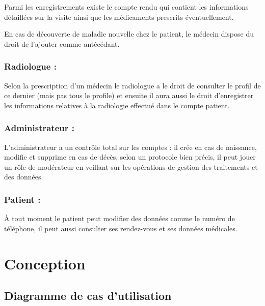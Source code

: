 Parmi les enregistrements existe le compte rendu qui contient les informations détaillées sur la visite ainsi que les médicaments prescrits éventuellement. 

En cas de découverte de maladie nouvelle chez le patient, le médecin dispose du droit de l’ajouter comme antécédant. 

\subsubsection{Radiologue :} 

Selon la prescription d’un médecin le radiologue a le droit de consulter le profil de ce dernier (mais pas tous le profile) et ensuite il aura aussi le droit d’enregistrer les informations relatives à la radiologie effectué dans le compte patient. 

\subsubsection{Administrateur :}  

L’administrateur a un contrôle total sur les comptes : il crée en cas de naissance, modifie et supprime en cas de décès, selon un protocole bien précis, il peut jouer un rôle de modérateur en veillant sur les opérations de gestion des traitements et des données. 

\subsubsection{Patient :} 

À tout moment le patient peut modifier des données comme le numéro de téléphone, il peut aussi consulter ses rendez-vous et ses données médicales. 



\section{Conception}

\subsection{Diagramme de cas d'utilisation }

\newpage



